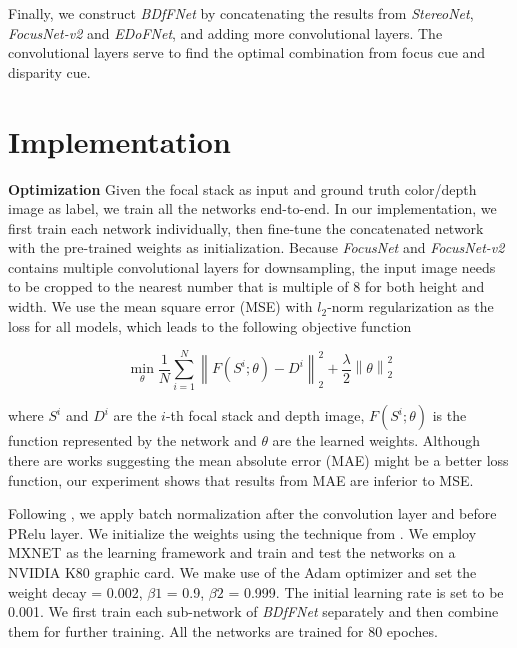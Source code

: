\documentclass[10pt,twocolumn,letterpaper]{article}
\begin{document}
Finally, we construct \emph{BDfFNet} by concatenating the results from \emph{StereoNet}, \emph{FocusNet-v2} and \emph{EDoFNet}, and adding more convolutional layers. The convolutional layers serve to find the optimal combination from focus cue and disparity cue.

\section{Implementation}
\label{section:implementation}

\noindent\textbf{Optimization}
Given the focal stack as input and ground truth color/depth image as label, we train all the networks end-to-end. In our implementation, we first train each network individually, then fine-tune the concatenated network with the pre-trained weights as initialization. Because \emph{FocusNet} and \emph{FocusNet-v2} contains multiple convolutional layers for downsampling,
the input image needs to be cropped to the nearest number that is multiple of 8 for both height and width. We use the mean square error (MSE) with $l_2$-norm regularization as the loss for all models, which leads to the following objective function

\begin{equation}
\label{eqn: lossFunction}
    \min_{\theta}\frac{1}{N}\sum_{i=1}^N\left\| F(S^{i};\theta)- D^{i} \right\rVert_{2}^{2} + \frac{\lambda}{2}\left\| \theta \right\rVert_{2}^{2}
\end{equation}

where $S^i$ and $D^i$ are the $i$-th focal stack and depth image, $F(S^{i};\theta)$ is the function represented by the network and $\theta$ are the learned weights. Although there are works \cite{zhao17} suggesting the mean absolute error (MAE) might be a better loss function, our experiment shows that results from MAE are inferior to MSE.

Following \cite{ioffe15}, we apply batch normalization after the convolution layer and before PRelu layer. We initialize the weights using the technique from \cite{he15}. We employ MXNET \cite{chen15} as the learning framework and train and test the networks on a NVIDIA K80 graphic card. We make use of the Adam optimizer \cite{kingma15} and set the weight decay = 0.002, $\beta1$ = 0.9, $\beta2$ = 0.999. The initial learning rate is set to be 0.001. We first train each sub-network of \emph{BDfFNet} separately and then combine them for further training. All the networks are trained for 80 epoches.
\end{document}
